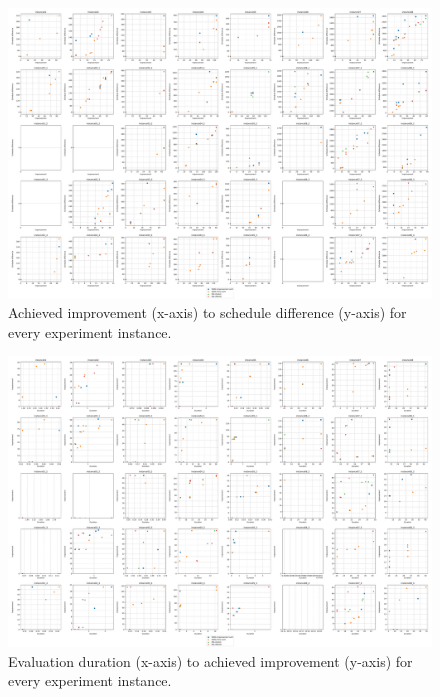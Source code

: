 \begin{figure}[p]
    \centering
    \includegraphics[angle=270,width=\textwidth]{img/exp_improv_diff.pdf}
    \caption{
        Achieved improvement (x-axis) to schedule
        difference (y-axis) for every experiment instance.
        }
    \label{fig:exp-full/improv-diff}
\end{figure}

\begin{figure}[p]
    \centering
    \includegraphics[angle=270,width=\textwidth]{img/exp_duration_improv.pdf}
    \caption{
        Evaluation duration (x-axis) to achieved
        improvement (y-axis) for every experiment instance.
        }
    \label{fig:exp-full/duration-improv}
\end{figure}
